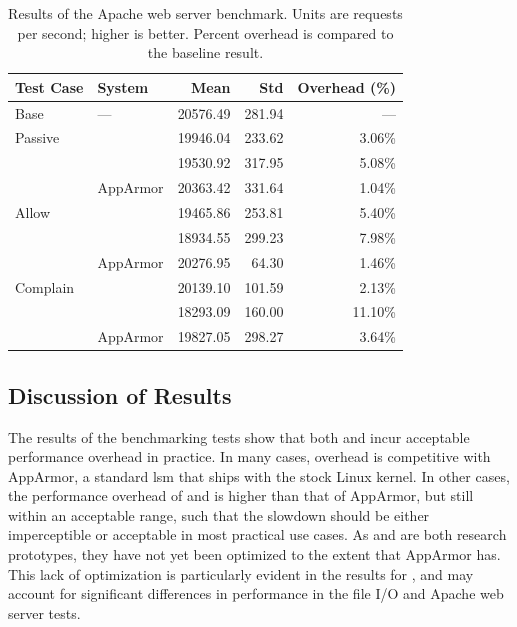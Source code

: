 \begingroup\small
\begin{longtable}[c]{llrrr}
  \caption[Results of the Apache web server benchmark]{
    Results of the Apache web server benchmark. Units are requests per second; higher is
    better. Percent overhead is compared to the baseline result.
  }%
  \label{tab:phoronix-apache}\\
  \toprule
   Test Case & System         &  Mean   & Std   & Overhead (\%)\\
   \midrule
   Base      & ---            & 20576.49 & 281.94 & ---     \\
   \midrule
   Passive   & \bpfbox{}      & 19946.04 & 233.62 &  3.06\% \\
             & \bpfcontain{}  & 19530.92 & 317.95 &  5.08\% \\
             & AppArmor       & 20363.42 & 331.64 &  1.04\% \\
   \midrule
   Allow     & \bpfbox{}      & 19465.86 & 253.81 &  5.40\% \\
             & \bpfcontain{}  & 18934.55 & 299.23 &  7.98\% \\
             & AppArmor       & 20276.95 &  64.30 &  1.46\% \\
   \midrule
   Complain  & \bpfbox{}      & 20139.10 & 101.59 &  2.13\% \\
             & \bpfcontain{}  & 18293.09 & 160.00 & 11.10\% \\
             & AppArmor       & 19827.05 & 298.27 &  3.64\% \\
  \bottomrule
\end{longtable}
\endgroup


\subsection{Discussion of Results}%
\label{ss:eval-performance-discussion}

The results of the benchmarking tests show that both \bpfbox{} and \bpfcontain{} incur
acceptable performance overhead in practice. In many cases, overhead is competitive with
AppArmor, a standard \gls{lsm} that ships with the stock Linux kernel. In other cases, the
performance overhead of \bpfbox{} and \bpfcontain{} is higher than that of AppArmor, but
still within an acceptable range, such that the slowdown should be either imperceptible or
acceptable in most practical use cases.  As \bpfbox{} and \bpfcontain{} are both research
prototypes, they have not yet been optimized to the extent that AppArmor has. This lack of
optimization is particularly evident in the results for \bpfcontain{}, and may account for
significant differences in performance in the file I/O and Apache web server tests.

